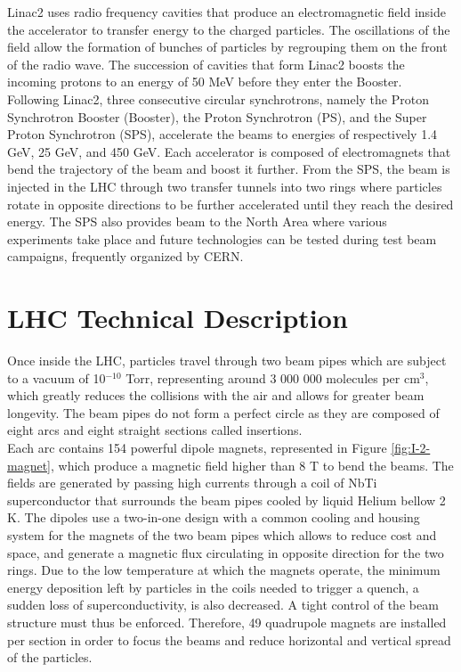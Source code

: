     Linac2 uses radio frequency cavities that produce an electromagnetic field inside the accelerator to transfer energy to the charged particles. The oscillations of the field allow the formation of bunches of particles by regrouping them on the front of the radio wave. The succession of cavities that form Linac2 boosts the incoming protons to an energy of 50 MeV before they enter the Booster. \\

    Following Linac2, three consecutive circular synchrotrons, namely the Proton Synchrotron Booster (Booster), the Proton Synchrotron (PS), and the Super Proton Synchrotron (SPS), accelerate the beams to energies of respectively 1.4 GeV, 25 GeV, and 450 GeV. Each accelerator is composed of electromagnets that bend the trajectory of the beam and boost it further. From the SPS, the beam is injected in the LHC through two transfer tunnels into two rings where particles rotate in opposite directions to be further accelerated until they reach the desired energy. The SPS also provides beam to the North Area where various experiments take place and future technologies can be tested during test beam campaigns, frequently organized by CERN.

  \section{LHC Technical Description}

    Once inside the LHC, particles travel through two beam pipes which are subject to a vacuum of 10$^{-10}$ Torr, representing around 3 000 000 molecules per cm$^3$, which greatly reduces the collisions with the air and allows for greater beam longevity. The beam pipes do not form a perfect circle as they are composed of eight arcs and eight straight sections called insertions. \\

    Each arc contains 154 powerful dipole magnets, represented in Figure \ref{fig:I-2-magnet}, which produce a magnetic field higher than 8 T to bend the beams. The fields are generated by passing high currents through a coil of NbTi superconductor that surrounds the beam pipes cooled by liquid Helium bellow 2 K. The dipoles use a two-in-one design with a common cooling and housing system for the magnets of the two beam pipes which allows to reduce cost and space, and generate a magnetic flux circulating in opposite direction for the two rings. Due to the low temperature at which the magnets operate, the minimum energy deposition left by particles in the coils needed to trigger a quench, a sudden loss of superconductivity, is also decreased. A tight control of the beam structure must thus be enforced. Therefore, 49 quadrupole magnets are installed per section in order to focus the beams and reduce horizontal and vertical spread of the particles. \\

